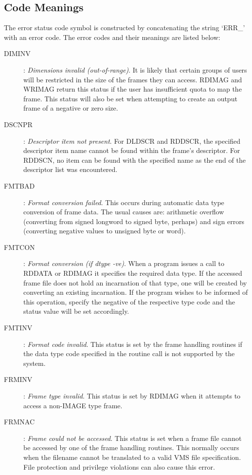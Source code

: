 \documentclass{article}
\begin{document}
\subsection {Code Meanings}
The error status code symbol is constructed by concatenating the string
`ERR\_' with an error code.
The error codes and their meanings are listed below:
\begin{description}
\item [DIMINV]:
{\em Dimensions invalid (out-of-range)}.
It is likely that certain groups of users will be restricted in the size of the
frames they can access.
RDIMAG and WRIMAG return this status if the user has insufficient quota to map
the frame.
This status will also be set when attempting to create an output frame of a
negative or zero size.
\item [DSCNPR]:
{\em Descriptor item not present}.
For DLDSCR and RDDSCR, the specified descriptor item name cannot be found within
the frame's descriptor.
For RDDSCN, no item can be found with the specified name as the end of the
descriptor list was encountered.
\item [FMTBAD]:
{\em Format conversion failed}.
This occurs during automatic data type conversion of frame data.
The usual causes are: arithmetic overflow (converting from signed longword to
signed byte, perhaps) and sign errors (converting negative values to unsigned
byte or word).
\item [FMTCON]:
{\em Format conversion (if dtype -ve)}.
When a program issues a call to RDDATA or RDIMAG it specifies the required data
type.
If the accessed frame file does not hold an incarnation of that type, one will
be created by converting an existing incarnation.
If the program wishes to be informed of this operation, specify the negative of
the respective type code and the status value will be set accordingly.
\item [FMTINV]:
{\em Format code invalid}.
This status is set by the frame handling routines if the data type code
specified in the routine call is not supported by the system.
\item [FRMINV]:
{\em Frame type invalid}.
This status is set by RDIMAG when it attempts to access a non-IMAGE type frame.
\item [FRMNAC]:
{\em Frame could not be accessed}.
This status is set when a frame file cannot be accessed by one of the frame
handling routines.
This normally occurs when the filename cannot be translated to a valid VMS file
specification.
File protection and privilege violations can also cause this error.

\end{description}
\end{document}
